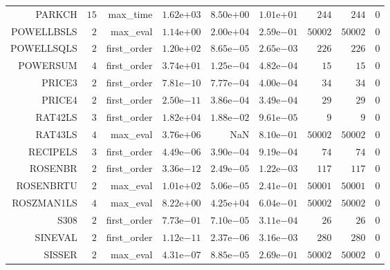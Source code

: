 \begin{longtable}{rrrrrrrrr}
PARKCH & \(    15\) & max\_time & \( 1.62\)e\(+03\) & \( 8.50\)e\(+00\) & \( 1.01\)e\(+01\) & \(   244\) & \(   244\) & \(     0\) \\
POWELLBSLS & \(     2\) & max\_eval & \( 1.14\)e\(+00\) & \( 2.00\)e\(+04\) & \( 2.59\)e\(-01\) & \( 50002\) & \( 50002\) & \(     0\) \\
POWELLSQLS & \(     2\) & first\_order & \( 1.20\)e\(+02\) & \( 8.65\)e\(-05\) & \( 2.65\)e\(-03\) & \(   226\) & \(   226\) & \(     0\) \\
POWERSUM & \(     4\) & first\_order & \( 3.74\)e\(+01\) & \( 1.25\)e\(-04\) & \( 4.82\)e\(-04\) & \(    15\) & \(    15\) & \(     0\) \\
PRICE3 & \(     2\) & first\_order & \( 7.81\)e\(-10\) & \( 7.77\)e\(-04\) & \( 4.00\)e\(-04\) & \(    34\) & \(    34\) & \(     0\) \\
PRICE4 & \(     2\) & first\_order & \( 2.50\)e\(-11\) & \( 3.86\)e\(-04\) & \( 3.49\)e\(-04\) & \(    29\) & \(    29\) & \(     0\) \\
RAT42LS & \(     3\) & first\_order & \( 1.82\)e\(+04\) & \( 1.88\)e\(-02\) & \( 9.61\)e\(-05\) & \(     9\) & \(     9\) & \(     0\) \\
RAT43LS & \(     4\) & max\_eval & \( 3.76\)e\(+06\) &       NaN & \( 8.10\)e\(-01\) & \( 50002\) & \( 50002\) & \(     0\) \\
RECIPELS & \(     3\) & first\_order & \( 4.49\)e\(-06\) & \( 3.90\)e\(-04\) & \( 9.19\)e\(-04\) & \(    74\) & \(    74\) & \(     0\) \\
ROSENBR & \(     2\) & first\_order & \( 3.36\)e\(-12\) & \( 2.49\)e\(-05\) & \( 1.22\)e\(-03\) & \(   117\) & \(   117\) & \(     0\) \\
ROSENBRTU & \(     2\) & max\_eval & \( 1.01\)e\(+02\) & \( 5.06\)e\(-05\) & \( 2.41\)e\(-01\) & \( 50001\) & \( 50001\) & \(     0\) \\
ROSZMAN1LS & \(     4\) & max\_eval & \( 8.22\)e\(+00\) & \( 4.25\)e\(+04\) & \( 6.04\)e\(-01\) & \( 50002\) & \( 50002\) & \(     0\) \\
S308 & \(     2\) & first\_order & \( 7.73\)e\(-01\) & \( 7.10\)e\(-05\) & \( 3.11\)e\(-04\) & \(    26\) & \(    26\) & \(     0\) \\
SINEVAL & \(     2\) & first\_order & \( 1.12\)e\(-11\) & \( 2.37\)e\(-06\) & \( 3.16\)e\(-03\) & \(   280\) & \(   280\) & \(     0\) \\
SISSER & \(     2\) & max\_eval & \( 4.31\)e\(-07\) & \( 8.85\)e\(-05\) & \( 2.69\)e\(-01\) & \( 50002\) & \( 50002\) & \(     0\) \\

\end{longtable}
